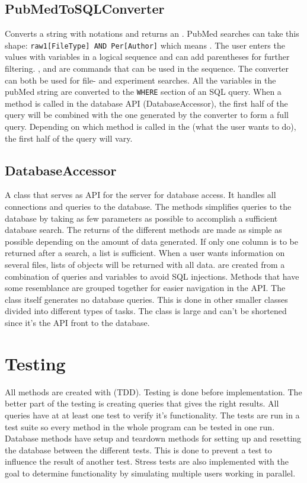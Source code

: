 \subsection{PubMedToSQLConverter}
Converts a string with  notations and returns an . PubMed searches can take this shape: \texttt{raw1[FileType] AND Per[Author]} which means . The user enters the values with variables in a logical sequence and can add parentheses for further filtering. ,  and  are commands that can be used in the sequence. The converter can both be used for file- and experiment searches. All the variables in the pubMed string are converted to the \texttt{WHERE} section of an SQL query. When a method is called in the database API (DatabaseAccessor), the first half of the query will be combined with the one generated by the converter to form a full query. Depending on which method is called in the  (what the user wants to do), the first half of the query will vary.

\subsection{DatabaseAccessor}
A class that serves as API for the server for database access. It handles all connections and queries to the database. The methods simplifies queries to the database by taking as few parameters as possible to accomplish a sufficient database search. The returns of the different methods are made as simple as possible depending on the amount of data generated. If only one column is to be returned after a search, a list is sufficient. When a user wants information on several files, lists of objects will be returned with all data.  are created from a combination of queries and variables to avoid SQL injections. Methods that have some resemblance are grouped together for easier navigation in the API. The class itself generates no database queries. This is done in other smaller classes divided into different types of tasks. The class is large and can't be shortened since it's the API front to the database.

\section{Testing}
All methods are created with  (TDD). Testing is done before implementation. The better part of the testing is creating queries that gives the right results. All queries have at at least one test to verify it's functionality. The tests are run in a test suite so every method in the whole program can be tested in one run. Database methods have setup and teardown methods for setting up and resetting the database between the different tests. This is done to prevent a test to influence the result of another test. Stress tests are also implemented with the goal to determine functionality by simulating multiple users working in parallel.